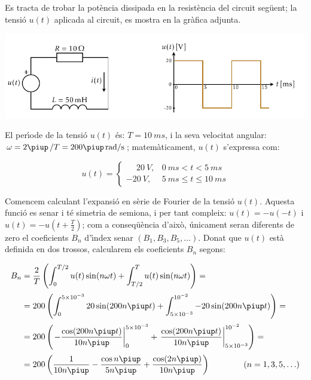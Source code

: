 \begin{exemple}
     Es tracta de trobar la pot\`{e}ncia
     dissipada en la resist\`{e}ncia del circuit seg\"{u}ent; la tensi\'{o} $u(t)$ aplicada al circuit,
     es mostra en la gr\`{a}fica adjunta.

    \begin{center}
        \includegraphics{Imatges/Cap-Fourier-Exemple-Circuit.pdf}
    \end{center}

     El per\'{\i}ode de la tensi\'{o} $u(t)$ \'{e}s: $T=\SI{10}{ms}$, i la
    seva velocitat angular: $\omega = 2\piup\,/T = 200\piup\unit{rad/s}$;
    matem\`{a}ticament, $u(t)$ s'expressa com:

    \[
    u(t) = \begin{cases} \phantom{-}\SI{20}{V}, & \SI{0}{ms} < t < \SI{5}{ms} \\
           \SI{-20}{V}, & \SI{5}{ms} \leq t \leq \SI{10}{ms} \end{cases}
    \]

    Comencem calculant l'expansi\'{o} en s\`{e}rie de Fourier de la tensi\'{o}
    $u(t)$. Aquesta funci\'{o} es senar i t\'{e} simetria de semiona, i per tant
     compleix: $u(t)=-u(-t)$ i $u(t) = -u(t+\frac{T}{2})$; com a
    conseq\"{u}\`{e}ncia d'aix\`{o}, \'{u}nicament seran diferents de zero el
    coeficients $B_n$ d'\'{\i}ndex senar $(B_1,B_3,B_5,\ldots)$. Donat que
    $u(t)$ est\`{a} definida en dos trossos, calcularem els coeficients
    $B_n$ segons:

    \[
    \begin{split}
        B_n &= \frac{2}{T} \left( \int_0^{T/2} u(t) \sin(n \omega t) +
        \int_{T/2}^{T} u(t) \sin(n \omega t) \right) =\\[0.5ex]
        &= 200 \left( \int_0^{5\times 10^{-3}} 20 \sin(200 n \piup t) +
        \int_{5\times 10^{-3}}^{10^{-2}} -20 \sin(200 n \piup t) \right) =\\[0.5ex]
        &= 200 \left( \left. -\frac{\cos(200 n \piup t)}{10 n \piup}\right|_0^{5\times 10^{-3}}
        +  \left.\frac{\cos(200 n \piup t)}{10 n \piup}\right|_{5\times
        10^{-3}}^{10^{-2}}\right)=\\[0.5ex]
        &= 200\left( \frac{1}{10 n \piup} - \frac{\cos n \piup}{5 n \piup} +
        \frac{\cos (2 n \piup)}{10 n \piup}\right)
        \qquad\qquad(n=1,3,5,\ldots)
    \end{split}
    \]


\end{exemple}
